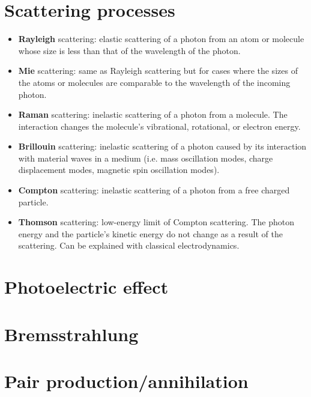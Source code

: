 \documentclass[a4paper,11pt]{report}
\begin{document}
\section{Scattering processes}
\begin{itemize}
    \item \textbf{Rayleigh} scattering: elastic scattering of a photon from an atom or molecule whose size is less than that of the wavelength of the photon. 
    \item \textbf{Mie} scattering: same as Rayleigh scattering but for cases where the sizes of the atoms or molecules are comparable to the wavelength of the incoming photon.
    \item \textbf{Raman} scattering: inelastic scattering of a photon from a molecule. The interaction changes the molecule's vibrational, rotational, or electron energy.
    \item \textbf{Brillouin} scattering: inelastic scattering of a photon caused by its interaction with material waves in a medium (i.e. mass oscillation modes, charge displacement modes, magnetic spin oscillation modes). 
    \item \textbf{Compton} scattering: inelastic scattering of a photon from a free charged particle. 
    \item \textbf{Thomson} scattering: low-energy limit of Compton scattering. The photon energy and the particle's kinetic energy do not change as a result of the scattering. Can be explained with classical electrodynamics.
\end{itemize}

\section{Photoelectric effect}

\section{Bremsstrahlung}

\section{Pair production/annihilation}




\end{document}
